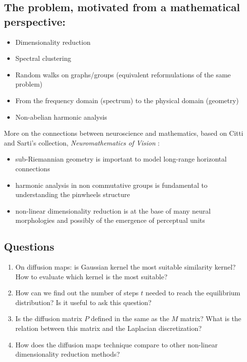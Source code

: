 \documentclass{article}
\begin{document}
\subsection{The problem, motivated from a mathematical perspective:} 
\begin{itemize}
    \item Dimensionality reduction 
    \item Spectral clustering
    \item Random walks on graphs/groups (equivalent reformulations of the same problem)
    \item From the frequency domain (spectrum) to the physical domain (geometry)
    \item Non-abelian harmonic analysis
\end{itemize}

More on the connections between neuroscience and mathematics, based on Citti and Sarti's collection, \textit{Neuromathematics of Vision} \cite{citti_neuromathematics_2014}:
\begin{itemize}
    \item sub-Riemannian geometry is important to model long-range horizontal connections
    \item harmonic analysis in non commutative groups is fundamental to understanding the pinwheels structure 
    \item non-linear dimensionality reduction is at the base of many neural morphologies and possibly of the emergence of perceptual units
\end{itemize}

\subsection{Questions}
\begin{enumerate}
    \item On diffusion maps: is Gaussian kernel the most suitable similarity kernel? How to evaluate which kernel is the most suitable? 
    \item How can we find out the number of steps $t$ needed to reach the equilibrium distribution? Is it useful to ask this question? 
    \item Is the diffusion matrix $P$ defined in \cite{coifman_diffusion_2006} the same as the $M$ matrix? What is the relation between this matrix and the Laplacian discretization? 
    \item How does the diffusion maps technique compare to other non-linear dimensionality reduction methods?
\end{enumerate}
\end{document}
